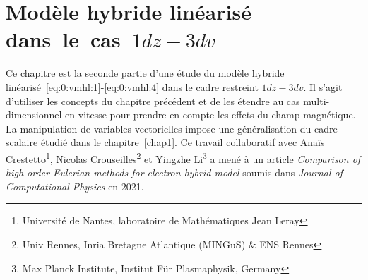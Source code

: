 \renewcommand{\localPath}{chap3}

\chapter{Modèle hybride linéarisé dans~le~cas~$1dz-3dv$}
\label{chap3}

Ce chapitre est la seconde partie d'une étude du modèle hybride linéarisé~\eqref{eq:0:vmhl:1}-\eqref{eq:0:vmhl:4} dans le cadre restreint $1dz-3dv$. Il s'agit d'utiliser les concepts du chapitre précédent et de les étendre au cas multi-dimensionnel en vitesse pour prendre en compte les effets du champ magnétique. La manipulation de variables vectorielles impose une généralisation du cadre scalaire étudié dans le chapitre~\ref{chap1}. Ce travail collaboratif avec Anaïs Crestetto\footnote{Université de Nantes, laboratoire de Mathématiques Jean Leray}, Nicolas Crouseilles\footnote{Univ Rennes, Inria Bretagne Atlantique (MINGuS) \& ENS Rennes} et Yingzhe Li\footnote{Max Planck Institute, Institut Für Plasmaphysik, Germany} a mené à un article \emph{Comparison of high-order Eulerian methods for electron hybrid model} soumis dans \emph{Journal of Computational Physics} en 2021.

\renewcommand{\textfraction}{.1}
\renewcommand{\floatpagefraction}{.8}









